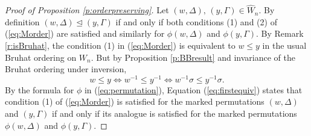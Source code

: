 \documentclass[12pt]{amsart}
\numberwithin{equation}{section}
\newcommand{\Wn}{{W}_n}
\newcommand{\cW}{{ W}}
\begin{document}
\begin{proof}[Proof of Proposition \ref{p:orderpreserving}]
Let $(w,\Delta),\, (y,\Gamma)\in\widehat{\cW}_{n}$.  By definition
$(w,\Delta) \unlhd (y,\Gamma)$ if and only if both conditions (1) and (2) of (\ref{eq:Morder}) are satisfied and similarly for $\phi(w,\Delta)$ and $\phi(y,\Gamma)$.  By Remark \ref{r:isBruhat}, the condition (1) in (\ref{eq:Morder}) is equivalent to $w\leq y$ in the usual Bruhat ordering on $\Wn$. But by Proposition \ref{p:BBresult} and invariance of the Bruhat ordering under inversion,
\begin{equation}\label{eq:firstequiv}
w\leq y\Leftrightarrow w^{-1} \leq y^{-1} \Leftrightarrow w^{-1}\sigma\leq y^{-1}\sigma.
\end{equation} 
  By the formula for $\phi$ in (\ref{eq:permutation}), Equation (\ref{eq:firstequiv}) states that condition (1) of (\ref{eq:Morder}) is satisfied for the marked permutations $(w,\Delta)$ and $(y,\Gamma)$ if and only if its analogue is satisfied for the marked permutations $\phi(w,\Delta)$ and $\phi(y,\Gamma)$.  


\end{proof}
\end{document}

